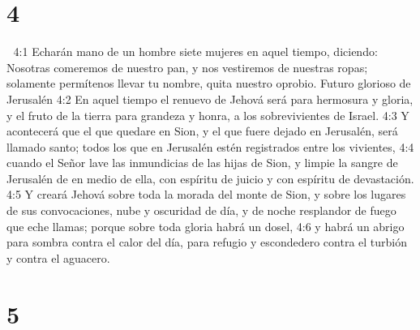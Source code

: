 \chapter{4}


4:1 Echarán mano de un hombre siete mujeres en aquel tiempo, diciendo: Nosotras comeremos de nuestro pan, y nos vestiremos de nuestras ropas; solamente permítenos llevar tu nombre, quita nuestro oprobio.  
Futuro glorioso de Jerusalén  
4:2 En aquel tiempo el renuevo de Jehová será para hermosura y gloria, y el fruto de la tierra para grandeza y honra, a los sobrevivientes de Israel.  
4:3 Y acontecerá que el que quedare en Sion, y el que fuere dejado en Jerusalén, será llamado santo; todos los que en Jerusalén estén registrados entre los vivientes,  
4:4 cuando el Señor lave las inmundicias de las hijas de Sion, y limpie la sangre de Jerusalén de en medio de ella, con espíritu de juicio y con espíritu de devastación.  
4:5 Y creará Jehová sobre toda la morada del monte de Sion, y sobre los lugares de sus convocaciones, nube y oscuridad de día, y de noche resplandor de fuego que eche llamas; porque sobre toda gloria habrá un dosel,  
4:6 y habrá un abrigo para sombra contra el calor del día, para refugio y escondedero contra el turbión y contra el aguacero.  

\chapter{5}

